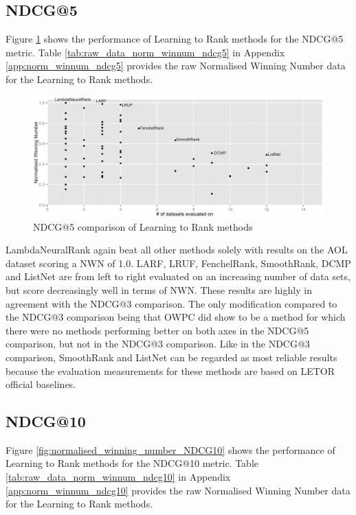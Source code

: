 \subsection{NDCG@5}
Figure \ref{fig:normalised_winning_number_NDCG5} shows the performance of Learning to Rank methods for the \ac{NDCG}@5 metric. Table \ref{tab:raw_data_norm_winnum_ndcg5} in Appendix \ref{app:norm_winnum_ndcg5} provides the raw Normalised Winning Number data for the Learning to Rank methods.\\

\begin{figure}[!h]
\includegraphics[scale=0.285]{gfx/ndcg5_winnum}
\caption{\acs{NDCG}@5 comparison of Learning to Rank methods}
\label{fig:normalised_winning_number_NDCG5}
\end{figure}

LambdaNeuralRank again beat all other methods solely with results on the AOL dataset scoring a \ac{NWN} of 1.0. LARF, LRUF, FenchelRank, SmoothRank, DCMP and ListNet are from left to right evaluated on an increasing number of data sets, but score decreasingly well in terms of \ac{NWN}. These results are highly in agreement with the \ac{NDCG}@3 comparison. The only modification compared to the \ac{NDCG}@3 comparison being that OWPC did show to be a method for which there were no methods performing better on both axes in the \ac{NDCG}@5 comparison, but not in the \ac{NDCG}@3 comparison. Like in the \ac{NDCG}@3 comparison, SmoothRank and ListNet can be regarded as most reliable results because the evaluation measurements for these methods are based on LETOR official baselines.

\subsection{NDCG@10}
Figure \ref{fig:normalised_winning_number_NDCG10} shows the performance of Learning to Rank methods for the \ac{NDCG}@10 metric. Table \ref{tab:raw_data_norm_winnum_ndcg10} in Appendix \ref{app:norm_winnum_ndcg10} provides the raw Normalised Winning Number data for the Learning to Rank methods.\\

